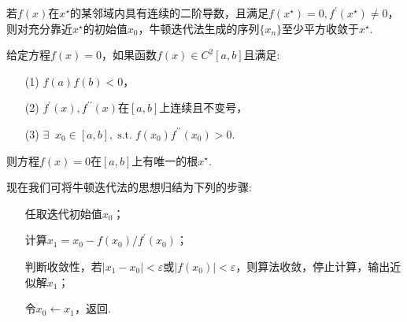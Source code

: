 \documentclass[cn,12pt,founder,a4paper]{elegantpaper}
\newcommand{\exist}{\exists\mathop{}\!}
\newcommand{\douprime}{{\prime\prime}}
\renewcommand{\emph}[1]{{\heiti{#1}}}
\DeclareMathOperator{\st}{s.t.}
\begin{document}
\begin{theorem}\label{th:1}
  若\(f(x)\)在\(x^\star\)的某邻域内具有连续的二阶导数，且满足\(f(x^\star)=0,f^\prime(x^\star)\ne 0\)，则对充分靠近\(x^\star\)的初始值\(x_0\)，牛顿迭代法生成的序列\(\lbrace x_n\rbrace\)至少平方收敛于\(x^\star\).
\end{theorem}
\begin{theorem}[非局部收敛定理]\label{th:2}
  给定方程\(f(x)=0\)，如果函数\(f(x)\in C^2[a,b]\)且满足:
  \begin{enumerate}
    \item[(1)] \(f(a)f(b)<0\)，
    \item[(2)] \(f^\prime(x),f^\douprime(x)\)在\([a,b]\)上连续且不变号，
    \item[(3)] \(\exist x_0\in[a,b],\st f(x_0)f^\douprime(x_0)>0\).   
  \end{enumerate}
  则方程\(f(x)=0\)在\([a,b]\)上有唯一的根\(x^\star\).
\end{theorem}
现在我们可将牛顿迭代法的思想归结为下列的步骤:
\begin{enumerate}
  \item[\emph{步一}] 任取迭代初始值\(x_0\)；
  \item[\emph{步二}] 计算\(x_1=x_0-{f(x_0)}/{f^\prime(x_0)}\)；
  \item[\emph{步三}] 判断收敛性，若\(\vert x_1-x_0\vert<\varepsilon\)或\(\vert f(x_0)\vert<\varepsilon\)，则算法收敛，停止计算，输出近似解\(x_1\)；
  \item[\emph{步四}] 令\(x_0\leftarrow x_1\)，返回\emph{步二}.   
\end{enumerate}
\end{document}
